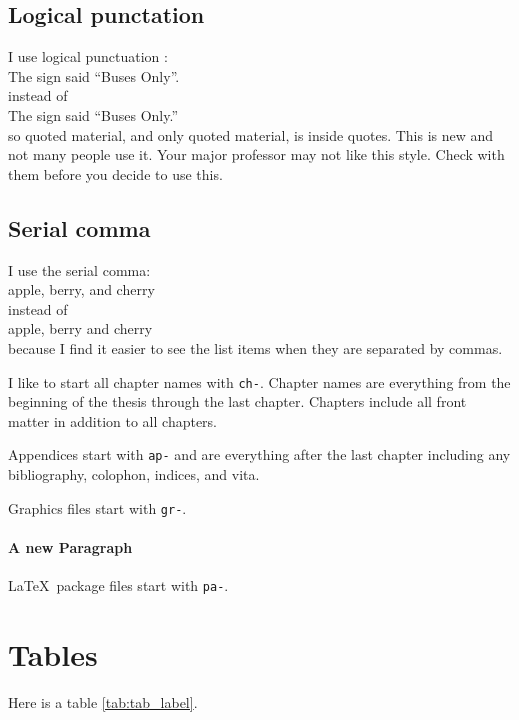 \subsection{Logical punctation}

I use logical punctuation \cite{yagoda2011}:\\
   The sign said ``Buses Only''.\\
instead of\\
   The sign said ``Buses Only.''\\
so quoted material,
and only quoted material,
is inside quotes.
This is new and not many people use it.
Your major professor may not like this style.
Check with them before you decide to use this.


\subsection{Serial comma}

I use the serial comma:\\
   apple, berry, and cherry\\
instead of\\
   apple, berry and cherry\\
because I find it easier
to see the list items
when they are separated by commas.





I like
to start all chapter names with \verb+ch-+.
Chapter names are everything
from the beginning of the thesis through the last chapter.
Chapters include all front matter
in addition to all chapters.

Appendices start with \verb+ap-+ and are everything after the last chapter
including any bibliography,
colophon,
indices,
and vita.

Graphics files start with \verb+gr-+.

\paragraph{A new Paragraph}

\LaTeX\ package files start with \verb+pa-+.


\section{Tables}

Here is a table \autoref{tab:tab_label}.

